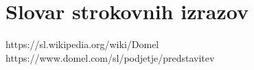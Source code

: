 \documentclass[12pt,a4paper]{amsart}
\theoremstyle{definition} %
\theoremstyle{plain} %
\newcommand{\geslo}[2]{\noindent\textbf{#1}\hspace*{3mm}\hangindent=\parindent\hangafter=1 #2}
\begin{document}
\section*{Slovar strokovnih izrazov}

%
%


\begin{thebibliography}{99}
https://sl.wikipedia.org/wiki/Domel\\
https://www.domel.com/sl/podjetje/predstavitev



\end{thebibliography}
\end{document}
